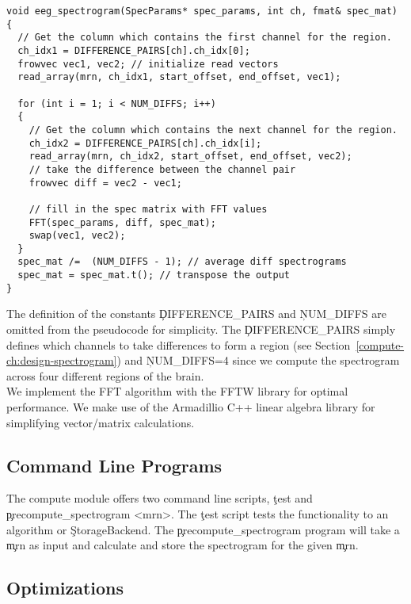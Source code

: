 \begin{lstlisting}
void eeg_spectrogram(SpecParams* spec_params, int ch, fmat& spec_mat)
{
  // Get the column which contains the first channel for the region.
  ch_idx1 = DIFFERENCE_PAIRS[ch].ch_idx[0];
  frowvec vec1, vec2; // initialize read vectors
  read_array(mrn, ch_idx1, start_offset, end_offset, vec1);

  for (int i = 1; i < NUM_DIFFS; i++)
  {
    // Get the column which contains the next channel for the region.
    ch_idx2 = DIFFERENCE_PAIRS[ch].ch_idx[i];
    read_array(mrn, ch_idx2, start_offset, end_offset, vec2);
    // take the difference between the channel pair
    frowvec diff = vec2 - vec1;

    // fill in the spec matrix with FFT values
    FFT(spec_params, diff, spec_mat);
    swap(vec1, vec2);
  }
  spec_mat /=  (NUM_DIFFS - 1); // average diff spectrograms
  spec_mat = spec_mat.t(); // transpose the output
}
\end{lstlisting}

The definition of the constants \c{DIFFERENCE\_PAIRS} and \c{NUM\_DIFFS} are
omitted from the pseudocode for simplicity. The \c{DIFFERENCE\_PAIRS} simply
defines which channels to take differences to form a region (see
Section~\ref{compute-ch:design-spectrogram}) and \c{NUM\_DIFFS=4} since we
compute the spectrogram across four different regions of the brain. \\

We implement the FFT algorithm with the FFTW library \cite{fftw} for optimal
performance. We make use of the Armadillio C++ linear algebra library
\cite{arma} for simplifying vector/matrix calculations.

\subsection{Command Line Programs}\label{compute-ch:implementation-cmd}

The compute module offers two command line scripts, \c{test} and
\c{precompute\_spectrogram <mrn>}. The \c{test} script tests the functionality
to an algorithm or \c{StorageBackend}. The \c{precompute\_spectrogram} program
will take a \c{mrn} as input and calculate and store the spectrogram for the
given \c{mrn}.

\subsection{Optimizations}

